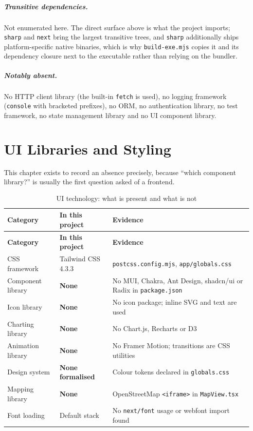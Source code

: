 \documentclass[11pt,a4paper]{report}
\newcommand{\code}[1]{\texttt{\small #1}}
\DeclareRobustCommand{\file}[1]{{\small\nolinkurl{#1}}}
\begin{document}
\paragraph{Transitive dependencies.} Not enumerated here. The direct surface
above is what the project imports; \code{sharp} and \code{next} bring the largest
transitive trees, and \code{sharp} additionally ships platform-specific native
binaries, which is why \file{build-exe.mjs} copies it and its dependency closure
next to the executable rather than relying on the bundler.

\paragraph{Notably absent.} No HTTP client library (the built-in \code{fetch} is
used), no logging framework (\code{console} with bracketed prefixes), no ORM, no
authentication library, no test framework, no state management library and no UI
component library.

\chapter{UI Libraries and Styling}
\label{sec:ui}

This chapter exists to record an absence precisely, because ``which component
library?'' is usually the first question asked of a frontend.

\begin{longtable}{@{}>{\raggedright\arraybackslash}p{3.8cm}>{\raggedright\arraybackslash}p{4.0cm}>{\raggedright\arraybackslash}p{6.8cm}@{}}
\caption{UI technology: what is present and what is not}\label{tab:ui}\\
\toprule
\textbf{Category} & \textbf{In this project} & \textbf{Evidence}\\
\midrule
\endfirsthead
\toprule
\textbf{Category} & \textbf{In this project} & \textbf{Evidence}\\
\midrule
\endhead
\bottomrule
\endfoot
CSS framework        & Tailwind CSS 4.3.3 & \file{postcss.config.mjs}, \file{app/globals.css}\\
Component library    & \textbf{None} & No MUI, Chakra, Ant Design, shadcn/ui or Radix in \file{package.json}\\
Icon library         & \textbf{None} & No icon package; inline SVG and text are used\\
Charting library     & \textbf{None} & No Chart.js, Recharts or D3\\
Animation library    & \textbf{None} & No Framer Motion; transitions are CSS utilities\\
Design system        & \textbf{None formalised} & Colour tokens declared in \file{globals.css}\\
Mapping library      & \textbf{None} & OpenStreetMap \code{<iframe>} in \file{MapView.tsx}\\
Font loading         & Default stack & No \code{next/font} usage or webfont import found\\
\end{longtable}
\end{document}

